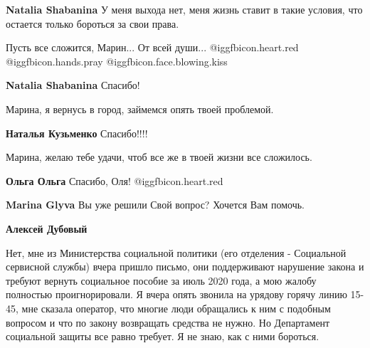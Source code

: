 \begin{itemize}
\begin{itemize}
\textbf{Natalia Shabanina} У меня выхода нет, меня жизнь ставит в такие условия, что остается только бороться за свои права.

Пусть все сложится, Марин... От всей души... @igg{fbicon.heart.red} @igg{fbicon.hands.pray}  @igg{fbicon.face.blowing.kiss} 

\textbf{Natalia Shabanina} Спасибо!

\end{itemize} %

Марина, я вернусь в город, займемся опять твоей проблемой.

\textbf{Наталья Кузьменко} Спасибо!!!!

Марина, желаю тебе удачи, чтоб все же в твоей жизни все сложилось.

\begin{itemize} %
\textbf{Ольга Ольга} Спасибо, Оля! @igg{fbicon.heart.red}

\textbf{Marina Glyva} Вы уже решили Свой вопрос? Хочется Вам помочь.

\textbf{Алексей Дубовый} 

Нет, мне из Министерства социальной политики (его отделения - Социальной
сервисной службы) вчера пришло письмо, они поддерживают нарушение закона и
требуют вернуть социальное пособие за июль 2020 года, а мою жалобу полностью
проигнорировали. Я вчера опять звонила на урядову горячу линию 15-45, мне
сказала оператор, что многие люди обращались к ним с подобным вопросом и что по
закону возвращать средства не нужно. Но Департамент социальной защиты все равно
требует. Я не знаю, как с ними бороться.

\end{itemize} %

\end{itemize} %
